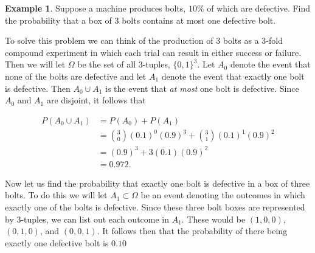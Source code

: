 \documentclass{article}
\theoremstyle{definition}
\theoremstyle{remark}
\theoremstyle{definition}
\newtheorem{example}{Example}[section]
\begin{document}
    \begin{example}
        Suppose a machine produces bolts, $10\%$ of which are defective. Find the probability that a box of 3 bolts contains at most one defective bolt.\par To solve this problem we can think of the production of 3 bolts as a 3-fold compound experiment in which each trial can result in either success or failure. Then we will let $\Omega$ be the set of all 3-tuples, $\{0,1\}^3$. Let $A_0$ denote the event that none of the bolts are defective and let $A_1$ denote the event that exactly one bolt is defective. Then $A_0\cup A_1$ is the event that \textit{at most} one bolt is defective. Since $A_0$ and $A_1$ are disjoint, it follows that 
        
        \begin{equation*}
            \begin{split}
                P(A_0\cup A_1) &= P(A_0)+P(A_1) \\
                &= \binom{3}{0}(0.1)^0(0.9)^3+\binom{3}{1}(0.1)^1(0.9)^2 \\
                &= (0.9)^3+3(0.1)(0.9)^2 \\
                &= 0.972.
            \end{split}
        \end{equation*}
        
        Now let us find the probability that exactly one bolt is defective in a box of three bolts. To do this we will let $A_1\subset\Omega$ be an event denoting the outcomes in which exactly one of the bolts is defective. Since these three bolt boxes are represented by 3-tuples, we can list out each outcome in $A_1$. These would be $(1,0,0)$, $(0,1,0)$, and $(0,0,1)$. It follows then that the probability of there being exactly one defective bolt is $0.10$ 
        
    \end{example}
    
\end{document}
